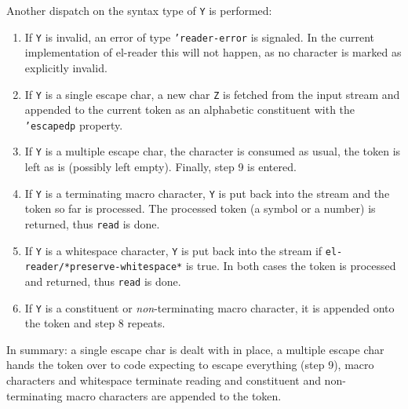 \documentclass[a4paper,10pt,twoside]{report}
\newcommand{\elr}{el-reader}
\newcommand{\fun}[1]{\texttt{#1}}
\newcommand{\Read}{\fun{read}}
\begin{document}
\begin{enumerate}
  Another dispatch on the syntax type of \texttt{Y} is performed:
  \begin{enumerate}
  \item If \texttt{Y} is invalid, an error of type \texttt{'reader-error} is
    signaled.  In the current implementation of \elr{} this will not happen, as
    no character is marked as explicitly invalid.
  \item If \texttt{Y} is a single escape char, a new char \texttt{Z} is fetched
    from the input stream and appended to the current token as an alphabetic
    constituent with the \texttt{'escapedp} property.
  \item If \texttt{Y} is a multiple escape char, the character is consumed as
    usual, the token is left as is (possibly left empty).  Finally, step 9 is
    entered.
  \item If \texttt{Y} is a terminating macro character, \texttt{Y} is put back
    into the stream and the token so far is processed.  The processed token (a
    symbol or a number) is returned, thus \Read{} is done.
  \item If \texttt{Y} is a whitespace character, \texttt{Y} is put back into the
    stream if \texttt{el-reader/*preserve-whitespace*} is true.  In both cases
    the token is processed and returned, thus \Read{} is done.
  \item If \texttt{Y} is a constituent or \emph{non}-terminating macro
    character, it is appended onto the token and step 8 repeats.
  \end{enumerate}

  In summary: a single escape char is dealt with in place, a multiple escape
  char hands the token over to code expecting to escape everything (step 9),
  macro characters and whitespace terminate reading and constituent and
  non-terminating macro characters are appended to the token.


\end{enumerate}
\end{document}
